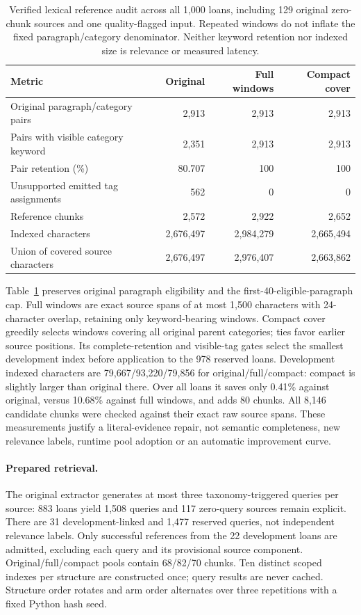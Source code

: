 \documentclass[11pt]{article}
\begin{document}
\begin{table}[t]
\centering\small\setlength{\tabcolsep}{5pt}
\begin{tabular}{lrrr}
\toprule
Metric & Original & Full windows & Compact cover \\
\midrule
Original paragraph/category pairs & 2,913 & 2,913 & 2,913 \\
Pairs with visible category keyword & 2,351 & 2,913 & 2,913 \\
Pair retention (\%) & 80.707 & 100 & 100 \\
Unsupported emitted tag assignments & 562 & 0 & 0 \\
Reference chunks & 2,572 & 2,922 & 2,652 \\
Indexed characters & 2,676,497 & 2,984,279 & 2,665,494 \\
Union of covered source characters & 2,676,497 & 2,976,407 & 2,663,862 \\
\bottomrule
\end{tabular}
\caption{Verified lexical reference audit across all 1,000 loans, including
129 original zero-chunk sources and one quality-flagged input. Repeated
windows do not inflate the fixed paragraph/category denominator.
Neither keyword retention nor indexed size is relevance or measured latency.}
\label{tab:reference-repair}
\end{table}

Table~\ref{tab:reference-repair} preserves original paragraph eligibility
and the first-40-eligible-paragraph cap. Full windows are exact source spans
of at most 1,500 characters with 24-character overlap, retaining only
keyword-bearing windows. Compact cover greedily selects windows covering
all original parent categories; ties favor earlier source positions.
Its complete-retention and visible-tag gates select the smallest development
index before application to the 978 reserved loans. Development indexed
characters are 79,667/93,220/79,856 for original/full/compact: compact is
slightly larger than original there. Over all loans it saves only 0.41\%
against original, versus 10.68\% against full windows, and adds 80 chunks.
All 8,146 candidate chunks were checked against their exact raw source spans.
These measurements justify a literal-evidence repair, not semantic completeness,
new relevance labels, runtime pool adoption or an automatic improvement curve.

\paragraph{Prepared retrieval.}
The original extractor generates at most three taxonomy-triggered queries
per source: 883 loans yield 1,508 queries and 117 zero-query sources remain
explicit. There are 31 development-linked and 1,477 reserved queries, not
independent relevance labels. Only successful references from the 22
development loans are admitted, excluding each query and its provisional
source component. Original/full/compact pools contain 68/82/70 chunks.
Ten distinct scoped indexes per structure are constructed once; query
results are never cached. Structure order rotates and arm order alternates
over three repetitions with a fixed Python hash seed.
\end{document}
